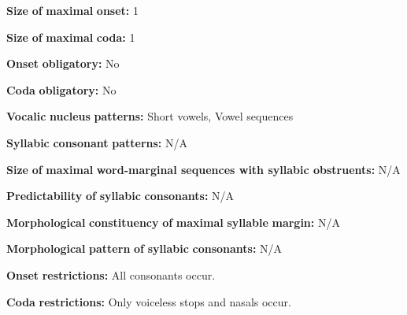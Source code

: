 \begin{styleBody}
\textbf{Size} \textbf{of} \textbf{maximal} \textbf{onset:} 1
\end{styleBody}

\begin{styleBody}
\textbf{Size} \textbf{of} \textbf{maximal} \textbf{coda:} 1
\end{styleBody}

\begin{styleBody}
\textbf{Onset} \textbf{obligatory:} No
\end{styleBody}

\begin{styleBody}
\textbf{Coda} \textbf{obligatory:} No
\end{styleBody}

\begin{styleBody}
\textbf{Vocalic} \textbf{nucleus} \textbf{patterns:} Short vowels, Vowel sequences
\end{styleBody}

\begin{styleBody}
\textbf{Syllabic} \textbf{consonant} \textbf{patterns:} N/A
\end{styleBody}

\begin{styleBody}
\textbf{Size} \textbf{of} \textbf{maximal} \textbf{word{}-marginal sequences with syllabic obstruents:} N/A
\end{styleBody}

\begin{styleBody}
\textbf{Predictability} \textbf{of} \textbf{syllabic} \textbf{consonants:} N/A
\end{styleBody}

\begin{styleBody}
\textbf{Morphological} \textbf{constituency} \textbf{of} \textbf{maximal} \textbf{syllable} \textbf{margin:} N/A
\end{styleBody}

\begin{styleBody}
\textbf{Morphological} \textbf{pattern} \textbf{of} \textbf{syllabic} \textbf{consonants:} N/A
\end{styleBody}

\begin{styleBody}
\textbf{Onset} \textbf{restrictions:} All consonants occur.
\end{styleBody}

\begin{styleBody}
\textbf{Coda} \textbf{restrictions:} Only voiceless stops and nasals occur.
\end{styleBody}

